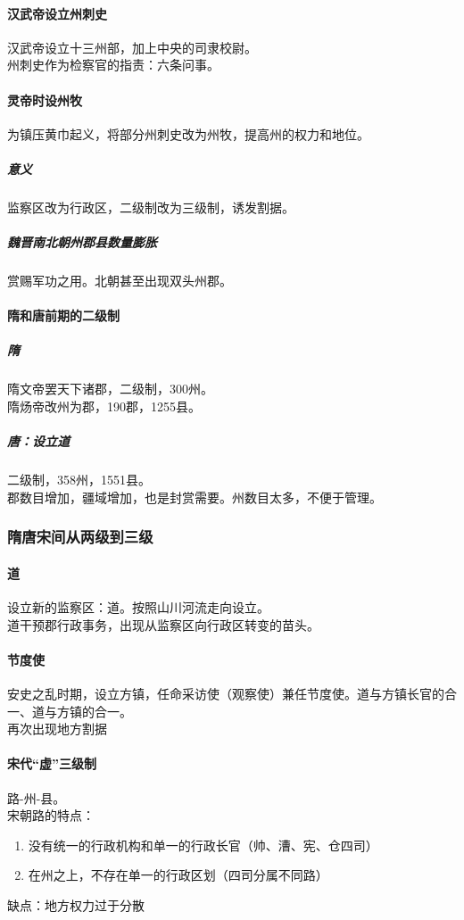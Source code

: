 \documentclass[twoside]{article}
\begin{document}
\paragraph*{汉武帝设立州刺史}
汉武帝设立十三州部，加上中央的司隶校尉。\\
州刺史作为检察官的指责：六条问事。
\paragraph*{灵帝时设州牧}
为镇压黄巾起义，将部分州刺史改为州牧，提高州的权力和地位。
\subparagraph*{意义}
监察区改为行政区，二级制改为三级制，诱发割据。
\subparagraph*{魏晋南北朝州郡县数量膨胀}
赏赐军功之用。北朝甚至出现双头州郡。
\paragraph*{隋和唐前期的二级制}
\subparagraph*{隋}
隋文帝罢天下诸郡，二级制，300州。\\
隋炀帝改州为郡，190郡，1255县。
\subparagraph*{唐：设立道}
二级制，358州，1551县。\\
郡数目增加，疆域增加，也是封赏需要。州数目太多，不便于管理。
\subsubsection{隋唐宋间从两级到三级}
\paragraph*{道}
设立新的监察区：道。按照山川河流走向设立。\\
道干预郡行政事务，出现从监察区向行政区转变的苗头。
\paragraph*{节度使}
安史之乱时期，设立方镇，任命采访使（观察使）兼任节度使。道与方镇长官的合一、道与方镇的合一。\\
再次出现地方割据
\paragraph*{宋代``虚''三级制}
路-州-县。\\
宋朝路的特点：
\begin{enumerate}
	\item 没有统一的行政机构和单一的行政长官（帅、漕、宪、仓四司）
	\item 在州之上，不存在单一的行政区划（四司分属不同路）
\end{enumerate}
缺点：地方权力过于分散
\end{document}
